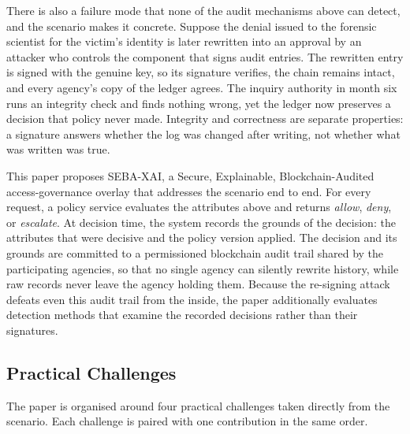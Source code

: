 There is also a failure mode that none of the audit mechanisms above can detect,
and the scenario makes it concrete. Suppose the denial issued to the forensic
scientist for the victim's identity is later rewritten into an approval by an
attacker who controls the component that signs audit entries. The rewritten
entry is signed with the genuine key, so its signature verifies, the chain
remains intact, and every agency's copy of the ledger agrees. The inquiry
authority in month six runs an integrity check and finds nothing wrong, yet the
ledger now preserves a decision that policy never made. Integrity and
correctness are separate properties: a signature answers whether the log was
changed after writing, not whether what was written was true.

This paper proposes SEBA-XAI, a Secure, Explainable, Blockchain-Audited
access-governance overlay that addresses the scenario end to end. For every
request, a policy service evaluates the attributes above and returns
\emph{allow}, \emph{deny}, or \emph{escalate}. At decision time, the system
records the grounds of the decision: the attributes that were decisive and the
policy version applied. The decision and its grounds are committed to a
permissioned blockchain audit trail shared by the participating agencies, so
that no single agency can silently rewrite history, while raw records never
leave the agency holding them. Because the re-signing attack defeats even this
audit trail from the inside, the paper additionally evaluates detection methods
that examine the recorded decisions rather than their signatures.

\subsection{Practical Challenges}

The paper is organised around four practical challenges taken directly from the
scenario. Each challenge is paired with one contribution in the same order.

